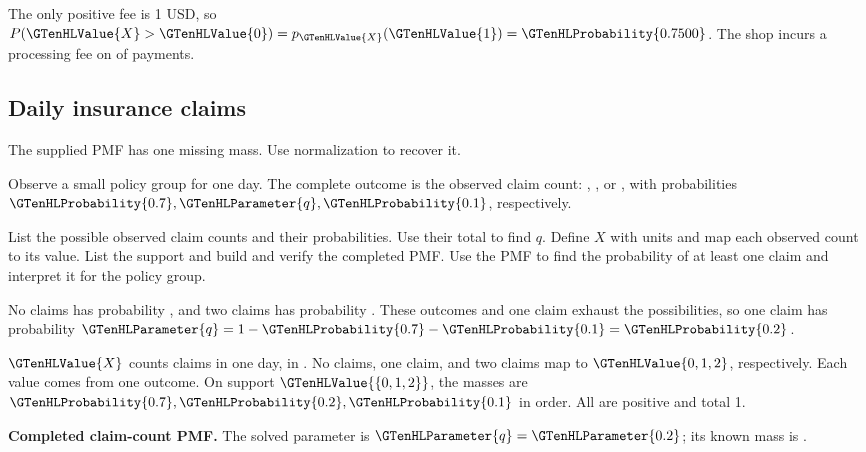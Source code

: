 The only positive fee is 1 USD, so $P(\GTenHLValue{X}>\GTenHLValue{0})=p_{\GTenHLValue{X}}(\GTenHLValue{1})=\GTenHLProbability{0.7500}$. The shop incurs a processing fee on  of payments.


\subsection{Daily insurance claims}
\label{subsec:t2-c1-daily-insurance-claims}
The supplied PMF has one missing mass. Use normalization to recover it.

Observe a small policy group for one day. The complete outcome is the observed claim count: , , or , with probabilities $\GTenHLProbability{0.7},\GTenHLParameter{q},\GTenHLProbability{0.1}$, respectively.

    {List the possible observed claim counts and their probabilities. Use their total to find $q$.}
    {Define $X$ with units and map each observed count to its value. List the support and build and verify the completed PMF.}
    {Use the PMF to find the probability of at least one claim and interpret it for the policy group.}

No claims has probability , and two claims has probability . These outcomes and one claim exhaust the possibilities, so one claim has probability $\GTenHLParameter{q}=1-\GTenHLProbability{0.7}-\GTenHLProbability{0.1}=\GTenHLProbability{0.2}$.

$\GTenHLValue{X}$ counts claims in one day, in . No claims, one claim, and two claims map to $\GTenHLValue{0,1,2}$, respectively. Each value comes from one outcome. On support $\GTenHLValue{\{0,1,2\}}$, the masses are $\GTenHLProbability{0.7},\GTenHLProbability{0.2},\GTenHLProbability{0.1}$ in order. All are positive and total 1.

\Needspace{6.8cm}
\par\noindent \begin{minipage}[t]{.485\linewidth}
\centering
{}
\par\small \textbf{Completed claim-count PMF.} The solved parameter is $\GTenHLParameter{q}=\GTenHLParameter{0.2}$; its known mass is .
\end{minipage}\par\medskip

